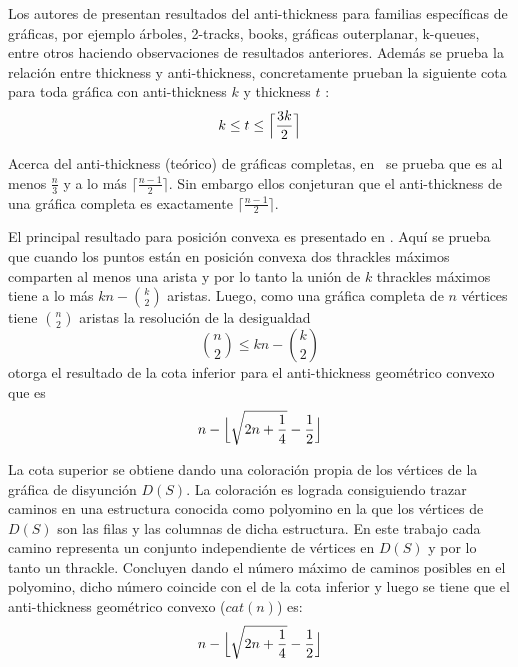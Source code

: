 %
Los autores de \cite{Dujmovic2017} presentan resultados
del anti-thickness para familias específicas de gráficas, por ejemplo árboles, 2-tracks, books, gráficas
outerplanar, k-queues, entre otros haciendo observaciones de resultados anteriores.
Además se prueba la relación entre thickness y anti-thickness, concretamente prueban
la siguiente cota para toda gráfica con anti-thickness $k$ y thickness $t$
: \[ k \leq t \leq \Bigl\lceil \frac{3k}{2}\Bigr\rceil \]

Acerca del anti-thickness (teórico) de gráficas completas, en~\cite{Dujmovic2017}
se prueba que es al menos $\frac{n}{3}$ y a lo más $\lceil \frac{n-1}{2} \rceil$.
Sin embargo ellos conjeturan que el anti-thickness de una gráfica completa es
exactamente $\lceil \frac{n-1}{2} \rceil$.


El principal resultado para posición convexa es presentado en \cite{Fabila-Monroy2018}.
Aquí se prueba que cuando los puntos están en posición convexa dos thrackles máximos
comparten al menos una arista y por lo tanto la unión de $k$ thrackles máximos tiene
a lo más $kn - \binom{k}{2}$ aristas. Luego, como una gráfica completa de $n$
vértices tiene $\binom{n}{2}$ aristas la resolución de la desigualdad
\[ \binom{n}{2} \leq kn - \binom{k}{2} \]
otorga el resultado de la cota inferior para el anti-thickness geométrico convexo que es
\[ n - \Bigl\lfloor \sqrt{2n + \frac{1}{4}} - \frac{1}{2} \Bigr\rfloor \]

La cota superior se obtiene dando una coloración propia de los vértices de la gráfica
de disyunción $D(S)$. La coloración es lograda consiguiendo trazar caminos en una
estructura conocida como polyomino en la que los vértices de $D(S)$ son las filas
y las columnas de dicha estructura. En este trabajo cada camino representa un
conjunto independiente de vértices en $D(S)$ y por lo tanto un thrackle. Concluyen
dando el número máximo de caminos posibles en el polyomino, dicho número coincide con
el de la cota inferior y luego se tiene que el anti-thickness geométrico convexo ($cat(n)$) es:
\[ n - \Bigl\lfloor \sqrt{2n + \frac{1}{4}} - \frac{1}{2} \Bigr\rfloor \]

